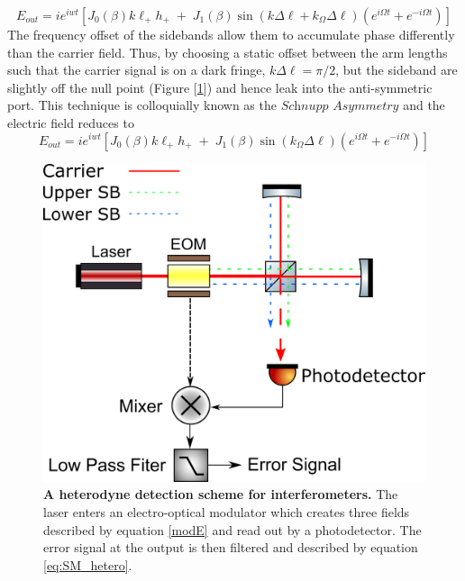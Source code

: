 		\begin{equation}
		E_{out} = i e^{iwt} [ J_0(\beta) 	k \ell_{+}  h_{+}  \; + \; J_1(\beta) \sin( k \Delta \ell + k_{\Omega} \Delta \ell) (e^{i\Omega t}  + e^{-i\Omega t}) ]
		\end{equation}
		The frequency offset of the sidebands allow them to accumulate phase differently than the carrier field. Thus, by choosing a static offset between the arm lengths such that the carrier signal is on a dark fringe, $k \Delta \ell = \pi/2$, but the sideband are slightly off the null point (Figure [\ref{fig:MichelsonHetero}]) and hence leak into the anti-symmetric port.  This technique is colloquially known as the $\textit{Schnupp}$ $\textit{Asymmetry}$ and the electric field reduces to
		\begin{equation}
		E_{out} = i e^{iwt} [ J_0(\beta) 	k \ell_{+}  h_{+}  \; + \; J_1(\beta) \sin(k_{\Omega} \Delta \ell) ( e^{i\Omega t} + e^{-i\Omega t}) ]
		\end{equation}
		
		\begin{figure}[h]
			\centering
			\includegraphics[width=.6 \textwidth]{../Figures/SimpleMichelsonHetero.png}
			\caption[A heterodyne detection scheme for interferometers.]  
			{\textbf{A heterodyne detection scheme for interferometers.} The laser enters an electro-optical modulator which creates three fields described by equation \ref{modE} and read out by a photodetector.  The error signal at the output is then filtered and described by equation \ref{eq:SM_hetero}.}
			\label{fig:MichelsonHetero}
		\end{figure}
		
